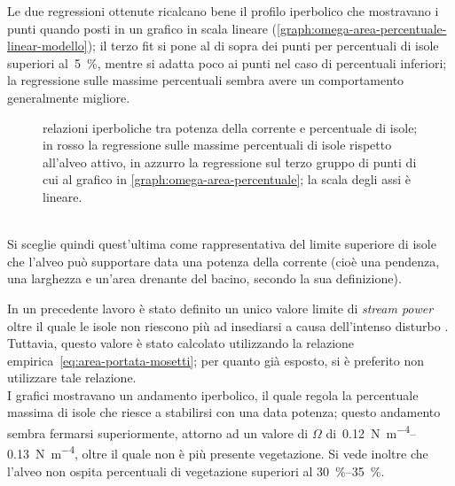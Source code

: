 Le due regressioni ottenute ricalcano bene il profilo iperbolico che mostravano i punti quando posti in un grafico in scala lineare (\cref{graph:omega-area-percentuale-linear-modello}); il terzo fit si pone al di sopra dei punti per percentuali di isole superiori al~\SI{5}{\percent}, mentre si adatta poco ai punti nel caso di percentuali inferiori; la regressione sulle massime percentuali sembra avere un comportamento generalmente migliore.
%
\begin{figure}
	\centering
	
	\caption[relazioni iperboliche tra potenza della corrente e percentuale di isole]{relazioni iperboliche tra potenza della corrente e percentuale di isole; in rosso la regressione sulle massime percentuali di isole rispetto all'alveo attivo, in azzurro la regressione sul terzo gruppo di punti di cui al grafico in \cref{graph:omega-area-percentuale}; la scala degli assi è lineare.}
	\label{graph:omega-area-percentuale-linear-regressioni}
\end{figure}
%
\\
Si sceglie quindi quest'ultima come rappresentativa del limite superiore di isole che l'alveo può supportare data una potenza della corrente (cioè una pendenza, una larghezza e un'area drenante del bacino, secondo la sua definizione).

In un precedente lavoro è stato definito un unico valore limite di \emph{stream power} oltre il quale le isole non riescono più ad insediarsi a causa dell'intenso disturbo .
Tuttavia, questo valore è stato calcolato utilizzando la relazione empirica~\eqref{eq:area-portata-mosetti}; per quanto già esposto, si è preferito non utilizzare tale relazione.
\\
I grafici mostravano un andamento iperbolico, il quale regola la percentuale massima di isole che riesce a stabilirsi con una data potenza;
questo andamento sembra fermarsi superiormente, attorno ad un valore di $\Omega$ di~\SIrange[range-phrase={-}, range-units = single]{0.12}{0.13}{\newton\per\metre\tothe{4}}, oltre il quale non è più presente vegetazione.
Si vede inoltre che l'alveo non ospita percentuali di vegetazione superiori al \SIrange[range-phrase={-}, range-units = single]{30}{35}{\percent}.

